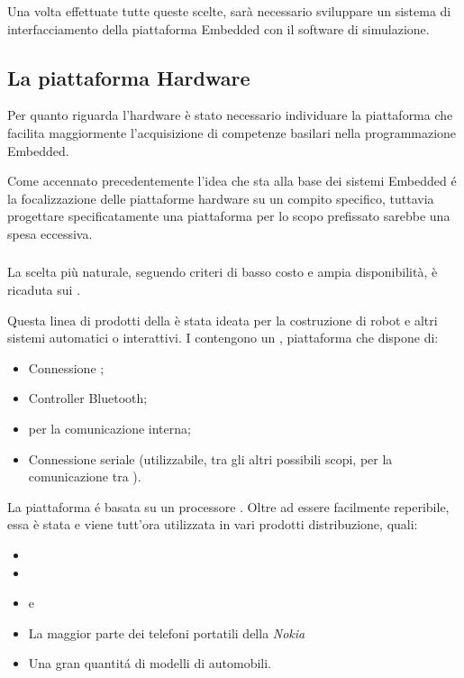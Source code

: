 Una volta effettuate tutte queste scelte, sar\`a necessario sviluppare un
sistema di interfacciamento della piattaforma Embedded con il software
di simulazione.

\subsection{La piattaforma Hardware}

Per quanto riguarda l'hardware \`e stato necessario individuare la
piattaforma che facilita maggiormente l'acquisizione di competenze
basilari nella programmazione Embedded.

Come accennato precedentemente l'idea che sta alla base dei sistemi
Embedded \'e la focalizzazione delle piattaforme hardware su un compito
specifico, tuttavia progettare specificatamente una piattaforma per lo
scopo prefissato sarebbe una spesa eccessiva.

\subsubsection{\nxt}

La scelta pi\`u naturale, seguendo criteri di basso costo e ampia
disponibilit\`a, \`e ricaduta sui \nxt.

Questa linea di prodotti della \lego \`e stata ideata per la costruzione di
robot e altri sistemi automatici o interattivi.  I \nxt{} contengono un   , piattaforma che
dispone di:

\begin{itemize}
\item Connessione ;
\item Controller Bluetooth;
\item {} \isquarec{} per la comunicazione interna;
\item Connessione seriale  (utilizzabile, tra gli altri
      possibili scopi, per la comunicazione tra \nxt).
\end{itemize}

La piattaforma  \'e basata su un processore
. Oltre ad essere facilmente reperibile, essa \`e stata e
viene tutt'ora utilizzata in vari prodotti distribuzione, quali:
\begin{itemize}
    \item {}
    \item {}
    \item {} e 
    \item La maggior parte dei telefoni portatili della \emph{Nokia}
    \item Una gran quantit\'a di modelli di automobili.
\end{itemize}

